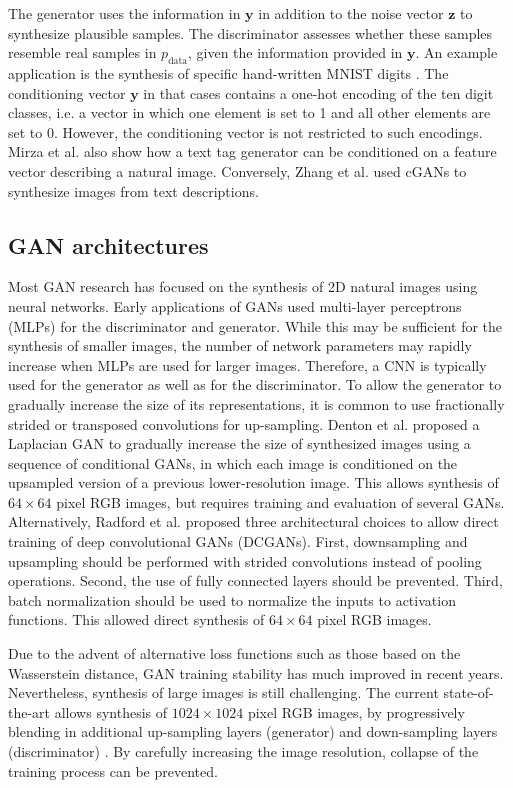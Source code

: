 \documentclass{article}
\begin{document}
The generator uses the information in $\mathbf{y}$ in addition to the noise vector $\mathbf{z}$ to synthesize plausible samples. The discriminator assesses whether these samples resemble real samples in $p_{\text{data}}$, given the information provided in $\mathbf{y}$. An example application is the synthesis of specific hand-written MNIST digits \cite{Mirz14}. The conditioning vector $\mathbf{y}$ in that cases contains a one-hot encoding of the ten digit classes, i.e. a vector in which one element is set to 1 and all other elements are set to 0. However, the conditioning vector is not restricted to such encodings. Mirza et al. \cite{Mirz14} also show how a text tag generator can be conditioned on a feature vector describing a natural image. Conversely, Zhang et al. \cite{Zhan17b} used cGANs to synthesize images from text descriptions. 

\subsection{GAN architectures}
Most GAN research has focused on the synthesis of 2D natural images using neural networks. Early applications of GANs used multi-layer perceptrons (MLPs) for the discriminator and generator. While this may be sufficient for the synthesis of smaller images, the number of network parameters may rapidly increase when MLPs are used for larger images. Therefore, a CNN is typically used for the generator as well as for the discriminator. To allow the generator to gradually increase the size of its representations, it is common to use fractionally strided or transposed convolutions for up-sampling. Denton et al. \cite{Dent15} proposed a Laplacian GAN to gradually increase the size of synthesized images using a sequence of conditional GANs, in which each image is conditioned on the upsampled version of a previous lower-resolution image. This allows synthesis of $64\times 64$ pixel RGB images, but requires training and evaluation of several GANs. Alternatively, Radford et al. \cite{Radf16} proposed three architectural choices to allow direct training of deep convolutional GANs (DCGANs). First, downsampling and upsampling should be performed with strided convolutions instead of pooling operations. Second, the use of fully connected layers should be prevented. Third, batch normalization should be used to normalize the inputs to activation functions. This allowed direct synthesis of $64\times 64$ pixel RGB images.

Due to the advent of alternative loss functions such as those based on the Wasserstein distance, GAN training stability has much improved in recent years. Nevertheless, synthesis of large images is still challenging. The current state-of-the-art allows synthesis of $1024 \times 1024$ pixel RGB images, by progressively blending in additional up-sampling layers (generator) and down-sampling layers (discriminator) \cite{Karr17}. By carefully increasing the image resolution, collapse of the training process can be prevented.  
\end{document}
